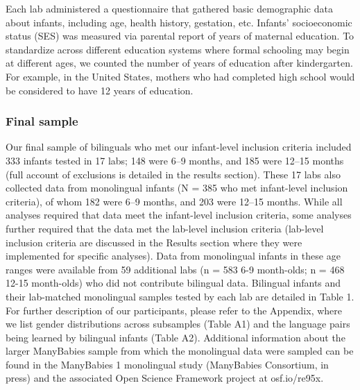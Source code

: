 \documentclass[english,,man,floatsintext]{apa6}
\begin{document}
Each lab administered a questionnaire that gathered basic demographic data about infants, including age, health history, gestation, etc. Infants' socioeconomic status (SES) was measured via parental report of years of maternal education. To standardize across different education systems where formal schooling may begin at different ages, we counted the number of years of education after kindergarten. For example, in the United States, mothers who had completed high school would be considered to have 12 years of education.

\hypertarget{final-sample}{%
\subsubsection{Final sample}\label{final-sample}}

Our final sample of bilinguals who met our infant-level inclusion criteria included 333 infants tested in 17 labs; 148 were 6--9 months, and 185 were 12--15 months (full account of exclusions is detailed in the results section). These 17 labs also collected data from monolingual infants (N = 385 who met infant-level inclusion criteria), of whom 182 were 6--9 months, and 203 were 12--15 months. While all analyses required that data meet the infant-level inclusion criteria, some analyses further required that the data met the lab-level inclusion criteria (lab-level inclusion criteria are discussed in the Results section where they were implemented for specific analyses). Data from monolingual infants in these age ranges were available from 59 additional labs (n = 583 6-9 month-olds; n = 468 12-15 month-olds) who did not contribute bilingual data. Bilingual infants and their lab-matched monolingual samples tested by each lab are detailed in Table 1. For further description of our participants, please refer to the Appendix, where we list gender distributions across subsamples (Table A1) and the language pairs being learned by bilingual infants (Table A2). Additional information about the larger ManyBabies sample from which the monolingual data were sampled can be found in the ManyBabies 1 monolingual study (ManyBabies Consortium, in press) and the associated Open Science Framework project at osf.io/re95x.

\begingroup\fontsize{11}{13}\selectfont
\end{document}
